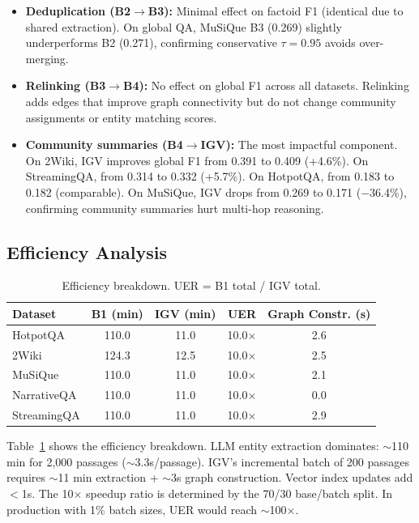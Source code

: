 \documentclass[sigconf,anonymous,review]{acmart}
\begin{document}
\begin{itemize}
\item \textbf{Deduplication (B2$\to$B3):} Minimal effect on factoid F1 (identical due to shared extraction). On global QA, MuSiQue B3 (0.269) slightly underperforms B2 (0.271), confirming conservative $\tau{=}0.95$ avoids over-merging.

\item \textbf{Relinking (B3$\to$B4):} No effect on global F1 across all datasets. Relinking adds edges that improve graph connectivity but do not change community assignments or entity matching scores.

\item \textbf{Community summaries (B4$\to$IGV):} The most impactful component. On 2Wiki, IGV improves global F1 from 0.391 to 0.409 (+4.6\%). On StreamingQA, from 0.314 to 0.332 (+5.7\%). On HotpotQA, from 0.183 to 0.182 (comparable). On MuSiQue, IGV drops from 0.269 to 0.171 ($-$36.4\%), confirming community summaries hurt multi-hop reasoning.
\end{itemize}

\subsection{Efficiency Analysis}

\begin{table}[t]
\centering
\caption{Efficiency breakdown. UER = B1 total / IGV total.}
\label{tab:eff}
\small
\begin{tabular}{lcccc}
\toprule
Dataset & B1 (min) & IGV (min) & UER & Graph Constr. (s) \\
\midrule
HotpotQA & 110.0 & 11.0 & 10.0$\times$ & 2.6 \\
2Wiki & 124.3 & 12.5 & 10.0$\times$ & 2.5 \\
MuSiQue & 110.0 & 11.0 & 10.0$\times$ & 2.1 \\
NarrativeQA & 110.0 & 11.0 & 10.0$\times$ & 0.0 \\
StreamingQA & 110.0 & 11.0 & 10.0$\times$ & 2.9 \\
\bottomrule
\end{tabular}
\end{table}

Table~\ref{tab:eff} shows the efficiency breakdown. LLM entity extraction dominates: $\sim$110 min for 2,000 passages ($\sim$3.3s/passage). IGV's incremental batch of 200 passages requires $\sim$11 min extraction + $\sim$3s graph construction. Vector index updates add $<$1s. The 10$\times$ speedup ratio is determined by the 70/30 base/batch split. In production with 1\% batch sizes, UER would reach $\sim$100$\times$.
\end{document}
